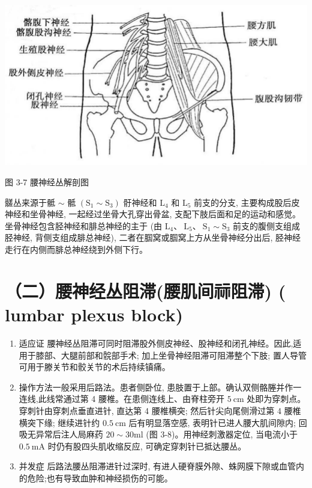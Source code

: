 \documentclass[10pt]{article}
\begin{document}
\begin{center}
\includegraphics[max width=\textwidth]{2024_07_09_002a177993bd97d1d6d7g-055}
\end{center}

图 3-7 腰神经丛解剖图

髊丛来源于骶 $\sim$ 骶 $\left(\mathrm{S}_{1} \sim \mathrm{S}_{3}\right)$ 骬神经和 $\mathrm{L}_{4}$ 和 $\mathrm{L}_{5}$ 前支的分支, 主要构成股后皮神经和坐骨神经, 一起经过坐骨大孔穿出骨盆, 支配下肢后面和足的运动和感觉。坐骨神经包含胫神经和腓总神经的主于 (由 $\mathrm{L}_{4} 、 \mathrm{~L}_{5} 、 \mathrm{~S}_{1} \sim \mathrm{S}_{3}$ 前支的腹侧支组成胫神经, 背侧支组成腓总神经), 二者在腘窝或腘窝上方从坐骨神经分出后, 胫神经走行在内侧而腓总神经绕到外侧下行。

\section*{（二）腰神经丛阻滞(腰肌间祘阻滞) ( lumbar plexus block)}
\begin{enumerate}
  \item 适应证 腰神经丛阻滞可同时阻滞股外侧皮神经、股神经和闭孔神经。因此,适用于膝部、大腿前部和䯘部手术; 加上坐骨神经阻滞可阻滞整个下肢; 置人导管可用于滕关节和骹关节的术后持续镇痛。

  \item 操作方法一般采用后路法。患者侧卧位, 患肢置于上部。确认双侧骼塍并作一连线,此线常通过第 4 腰椎。在患侧连线上、由脊柱旁开 $5 \mathrm{~cm}$ 处即为穿刺点。穿刺针由穿刺点垂直进针, 直达第 4 腰椎横突; 然后针尖向尾侧滑过第 4 腰椎横突下缘; 继续进针约 $0.5 \mathrm{~cm}$ 后有明显落空感, 表明针已进人腰大肌间隙内; 回吸无异常后注人局麻药 $20 \sim 30 \mathrm{ml}$ (图 3-8)。用神经刺激器定位, 当电流小于 $0.5 \mathrm{~mA}$ 时仍有股四头肌收缩反应, 可确定穿刺针已抵达腰丛。

  \item 并发症 后路法腰丛阻滞进针过深时, 有进人硬脊膜外隙、蛛网膜下隙或血管内的危险;也有导致血肿和神经损伤的可能。

\end{enumerate}
\end{document}
